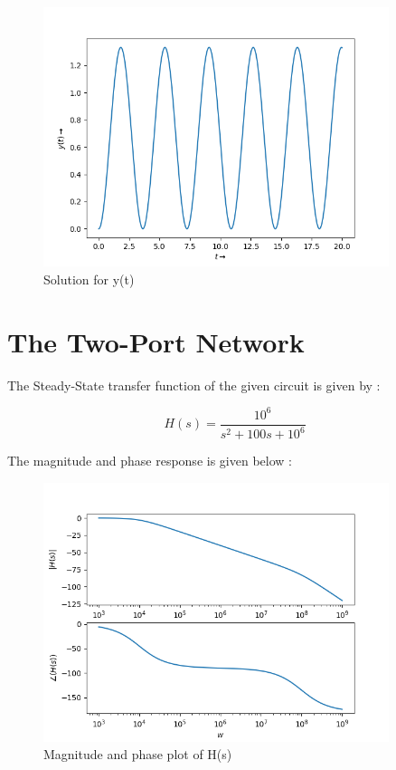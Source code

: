 \documentclass[10pt,a4paper]{article}
\begin{document}
\begin{figure}[!tbh]

\includegraphics[width = 0.9\textwidth]{4b.png}
\caption{Solution for y(t)}

\end{figure}

\section{The Two-Port Network}

The Steady-State transfer function of the given circuit is given by :

\[
    H(s) = \frac{10^6}{s^2 + 100s + 10^6}
\]

The magnitude and phase response is given below : 

\begin{figure}[!tbh]

\includegraphics[width = 0.9\textwidth]{5.png}
\caption{Magnitude and phase plot of H(s)}

\end{figure}
\end{document}
